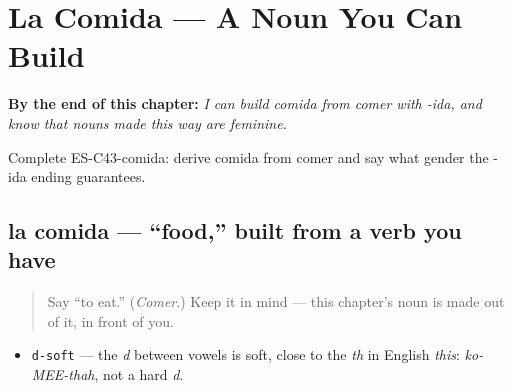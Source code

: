 
\chapter{La Comida --- A Noun You Can Build}
\label{ch:noun-comida}

\begin{chapteropening}
\textbf{By the end of this chapter:} \emph{I can build comida from comer with -ida, and know that nouns made this way are feminine.}

Complete ES-C43-comida: derive comida from comer and say what gender the -ida ending guarantees.
\end{chapteropening}

\section[la comida]{la comida — \textquotedblleft{}food,\textquotedblright{} built from a verb you have}

\label{lesson:ES-C43-comida}



\begin{quote}
Say \textquotedblleft{}to eat.\textquotedblright{} (\emph{Comer}.) Keep it in mind — this chapter's noun is made out of it, in front of you.
\end{quote}

\begin{sounds}
\begin{itemize}
\raggedright
  \item \texttt{d-soft} — the \emph{d} between vowels is soft, close to the \emph{th} in English \emph{this}: \emph{ko-MEE-thah}, not a hard \emph{d}.
\end{itemize}
\end{sounds}

